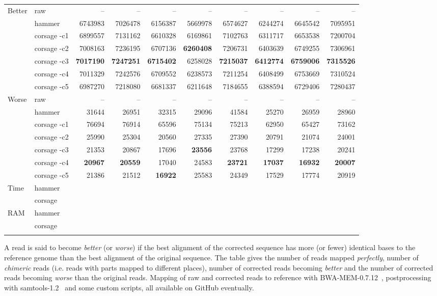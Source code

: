 \documentclass{bioinfo2}
\begin{document}
\begin{table}[p]
{\begin{tabular}{llrrrrrrrr}
\midrule
Better   & raw         & -- & -- & -- & -- & -- & -- & -- & -- \\
         & hammer      & 6743983 & 7026478 & 6156387 & 5669978 & 6574627 & 6244274 & 6645542 & 7095951 \\
         & corsage -c1 & 6899557 & 7131162 & 6610328 & 6169861 & 7102763 & 6311717 & 6653538 & 7200704 \\
         & corsage -c2 & 7008163 & 7236195 & 6707136 & \textbf{6260408} & 7206731 & 6403639 & 6749255 & 7306961 \\
         & corsage -c3 & \textbf{7017190} & \textbf{7247251} & \textbf{6715402} & 6258028 & \textbf{7215037} & \textbf{6412774} & \textbf{6759006} & \textbf{7315526} \\
         & corsage -c4 & 7011329 & 7242576 & 6709552 & 6238573 & 7211254 & 6408499 & 6753669 & 7310524 \\
         & corsage -c5 & 6987270 & 7218080 & 6681337 & 6211648 & 7184655 & 6388594 & 6729406 & 7280437 \\
\midrule
Worse    & raw         & -- & -- & -- & -- & -- & -- & -- & -- \\
         & hammer      &   31644 &   26951 &   32315 &   29096 &   41584 &   25270 &   26959 &   28960 \\
         & corsage -c1 &   76694 &   76914 &   65596 &   75134 &   75213 &   62950 &   65427 &   73162 \\
         & corsage -c2 &   25990 &   25304 &   20560 &   27335 &   27390 &   20791 &   21074 &   24001 \\
         & corsage -c3 &   21353 &   20867 &   17696 &   \textbf{23556} &   23768 &   17299 &   17238 &   20241 \\
         & corsage -c4 &   \textbf{20967} &   \textbf{20559} &   17040 &   24583 &   \textbf{23721} &   \textbf{17037} &   \textbf{16932} &   \textbf{20007} \\
         & corsage -c5 &   21386 &   21512 &   \textbf{16922} &   25583 &   24349 &   17529 &   17774 &   20919 \\
\midrule
Time    & hammer      &  \\
        & corsage     &  \\
\midrule
RAM    & hammer      &  \\
       & corsage     &  \\
\botrule
\end{tabular}}
{A read is said to become \emph{better} (or \emph{worse}) if the best alignment of the corrected sequence has more (or fewer) identical bases to the reference genome than the best alignment of the original sequence.
The table gives the number of reads mapped \emph{perfectly}, number of \emph{chimeric} reads (i.e. reads with parts mapped to different places), number of corrected reads becoming \emph{better} and the number of corrected reads becoming \emph{worse} than the original reads.
Mapping of raw and corrected reads to reference with BWA-MEM-0.7.12~\citep{bwamem}, postprocessing with samtools-1.2~\citep{samtools} and some custom scripts, all available on GitHub eventually.} %
\end{table}
\end{document}
